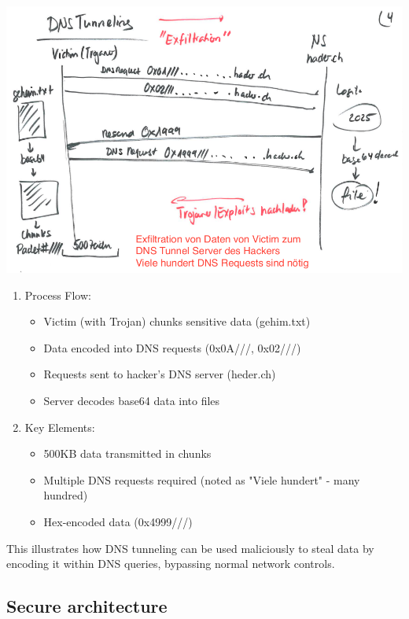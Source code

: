 \includegraphics[scale=0.5]{resources/03-dns-tunneling-2.png}
\begin{enumerate}
  \item Process Flow:
  \begin{itemize}
    \tightlist
		\item Victim (with Trojan) chunks sensitive data (gehim.txt)
		\item Data encoded into DNS requests (0x0A///, 0x02///)
		\item Requests sent to hacker's DNS server (heder.ch)
		\item Server decodes base64 data into files
  \end{itemize}

  \item Key Elements:
  \begin{itemize}
    \tightlist
		\item 500KB data transmitted in chunks
		\item Multiple DNS requests required (noted as "Viele hundert" - many hundred)
		\item Hex-encoded data (0x4999///)
  \end{itemize}
\end{enumerate}
This illustrates how DNS tunneling can be used maliciously to steal data by encoding it within DNS queries, bypassing normal network controls.

\subsection{Secure architecture}

